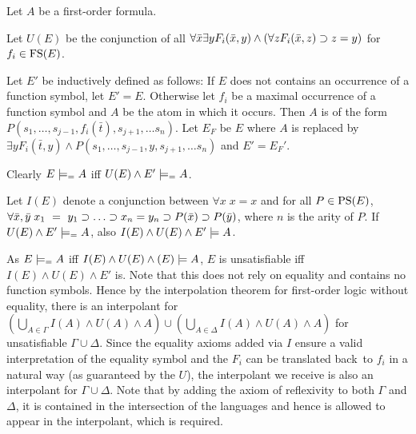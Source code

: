 Let $A$ be a first-order formula.

Let $U(E)$ be the conjunction of all $\forall \bar x \exists y F_i(\bar x, y) \land (\forall z F_i(\bar x, z) \supset z = y)$ for $f_i \in \mathrm{FS}(E)$.

Let $E'$ be inductively defined as follows: If $E$ does not contains an occurrence of a function symbol, let $E' = E$.
Otherwise let $f_i$ be a maximal occurrence of a function symbol and $A$ be the atom in which it occurs. Then $A$ is of the form $P(s_1, \ldots, s_{j-1}, f_i(\bar t), s_{j+1}, \ldots s_n)$.
Let $E_F$ be $E$ where $A$ is replaced by $\exists y F_i(\bar t, y) \land P(s_1, \ldots, s_{j-1}, y, s_{j+1}, \ldots s_n)$ and $E' = E_F'$.

Clearly $E \models_= A$ iff $U(E) \land  E' \models_= A$.

Let $I(E)$ denote a conjunction between $\forall x \; x=x$ and for all $P \in\mathrm{PS}(E)$, $\forall \bar x, \bar y\; x_1~=~y_1 \supset \ldots \supset x_n = y_n \supset P(\bar x) \supset P(\bar y)$, where $n$ is the arity of $P$.
If $U(E) \land E' \models_= A$,
also $I(E) \land U(E) \land E' \models A$. 


As $E \models_= A$ iff $I(E) \land U(E) \land (E) \models A$, $E$ is unsatisfiable iff $I(E) \land U(E) \land E'$ is.
Note that this does not rely on equality and contains no function symbols. Hence by the interpolation theorem for first-order logic without equality, there is an interpolant for $\left(\bigcup_{A\in \Gamma} I(A) \land U(A) \land A\right) \cup \left(\bigcup_{A\in \Delta} I(A) \land U(A) \land A\right) $ for unsatisfiable $\Gamma \cup \Delta$.
Since the equality axioms added via $I$ ensure a valid interpretation of the equality symbol and the $F_i$ can be translated back\ to $f_i$ in a natural way (as guaranteed by the $U$), the interpolant we receive is also an interpolant for $\Gamma \cup \Delta$.
Note that by adding the axiom of reflexivity to both $\Gamma$ and $\Delta$, it is contained in the intersection of the languages and hence is allowed to appear in the interpolant, which is required. 


